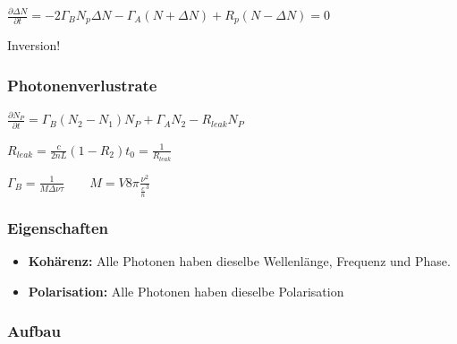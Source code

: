 \documentclass[10pt,a4paper]{scrartcl}
\begin{document}
\begin{multicols*}{3}
	\dahe $\frac{\partial \Delta N}{\partial t}=-2\Gamma_BN_p\Delta N-\Gamma_A(N+\Delta N)+R_p(N-\Delta N)=0$
	
	\finn	
	
	\dahe {} \dahe Inversion!
	
	\subsubsection{Photonenverlustrate}
	
	$\frac{\partial N_P}{\partial t}=\Gamma_B(N_2-N_1)N_P+\Gamma_AN_2-R_{leak}N_P$
	
	$R_{leak}=\frac{c}{2nL}(1-R_2)$\hfill$t_0=\frac{1}{R_{leak}}$
	
	$\Gamma_B=\frac{1}{M\Delta\nu\tau}\qquad M=V8\pi\frac{\nu^2}{\frac{c}{n}^3}$
	
	
	
	\subsubsection{Eigenschaften}
	
	\begin{itemize}
	\compaq
	\item \textbf{Kohärenz:}
	Alle Photonen haben dieselbe Wellenlänge, Frequenz und Phase.
	\item \textbf{Polarisation:}
	Alle Photonen haben dieselbe Polarisation	
	
	\end{itemize}	
	
	\subsubsection{Aufbau}
	
	

\end{multicols*}
\end{document}
